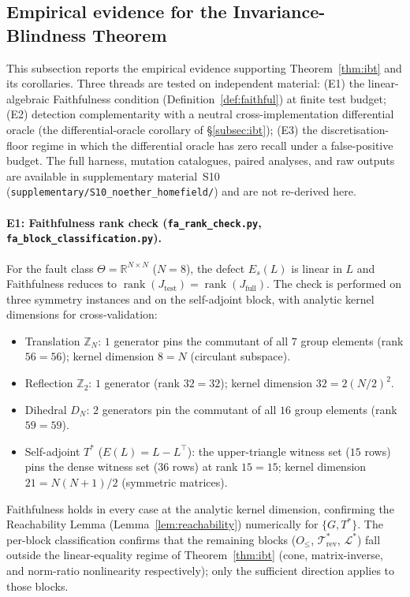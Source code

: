 \documentclass[manuscript]{acmart}
\begin{document}
\subsection{Empirical evidence for the Invariance-Blindness Theorem}
\label{subsec:ibt-empirical}

This subsection reports the empirical evidence supporting Theorem~\ref{thm:ibt} and its corollaries. Three threads are tested on independent material: (E1) the linear-algebraic Faithfulness condition (Definition~\ref{def:faithful}) at finite test budget; (E2) detection complementarity with a neutral cross-implementation differential oracle (the differential-oracle corollary of \S\ref{subsec:ibt}); (E3) the discretisation-floor regime in which the differential oracle has zero recall under a false-positive budget. The full harness, mutation catalogues, paired analyses, and raw outputs are available in supplementary material~S10 (\texttt{supplementary/S10\_noether\_homefield/}) and are not re-derived here.

\paragraph{E1: Faithfulness rank check (\texttt{fa\_rank\_check.py}, \texttt{fa\_block\_classification.py}).}
For the fault class $\Theta = \mathbb{R}^{N \times N}$ ($N = 8$), the defect $E_s(L)$ is linear in $L$ and Faithfulness reduces to $\operatorname{rank}(J_{\mathrm{test}}) = \operatorname{rank}(J_{\mathrm{full}})$. The check is performed on three symmetry instances and on the self-adjoint block, with analytic kernel dimensions for cross-validation:
\begin{itemize}[leftmargin=*,nosep]
  \item Translation $\mathbb{Z}_N$: $1$ generator pins the commutant of all $7$ group elements (rank $56=56$); kernel dimension $8 = N$ (circulant subspace).
  \item Reflection $\mathbb{Z}_2$: $1$ generator (rank $32 = 32$); kernel dimension $32 = 2(N/2)^{2}$.
  \item Dihedral $D_N$: $2$ generators pin the commutant of all $16$ group elements (rank $59 = 59$).
  \item Self-adjoint $T^{*}$ ($E(L) = L - L^{\top}$): the upper-triangle witness set ($15$ rows) pins the dense witness set ($36$ rows) at rank $15 = 15$; kernel dimension $21 = N(N+1)/2$ (symmetric matrices).
\end{itemize}
Faithfulness holds in every case at the analytic kernel dimension, confirming the Reachability Lemma (Lemma~\ref{lem:reachability}) numerically for $\{G, T^{*}\}$. The per-block classification confirms that the remaining blocks ($O_{\le}$, $\mathcal{T}^{*}_{\mathrm{rev}}$, $\mathcal{L}^{*}$) fall outside the linear-equality regime of Theorem~\ref{thm:ibt} (cone, matrix-inverse, and norm-ratio nonlinearity respectively); only the sufficient direction applies to those blocks.
\end{document}
